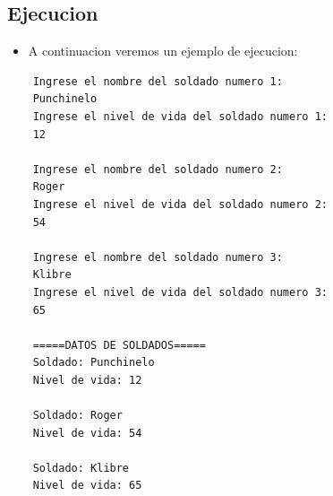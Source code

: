 \documentclass{article}
\begin{document}
\subsection{Ejecucion}
\begin{itemize}
    \item A continuacion veremos un ejemplo de ejecucion:
\end{itemize}
\begin{lstlisting}
    Ingrese el nombre del soldado numero 1:
    Punchinelo
    Ingrese el nivel de vida del soldado numero 1:
    12
    
    Ingrese el nombre del soldado numero 2:
    Roger
    Ingrese el nivel de vida del soldado numero 2:
    54
    
    Ingrese el nombre del soldado numero 3:
    Klibre
    Ingrese el nivel de vida del soldado numero 3:
    65
    
    =====DATOS DE SOLDADOS=====
    Soldado: Punchinelo
    Nivel de vida: 12
    
    Soldado: Roger
    Nivel de vida: 54
    
    Soldado: Klibre
    Nivel de vida: 65

\end{lstlisting}
\end{document}
